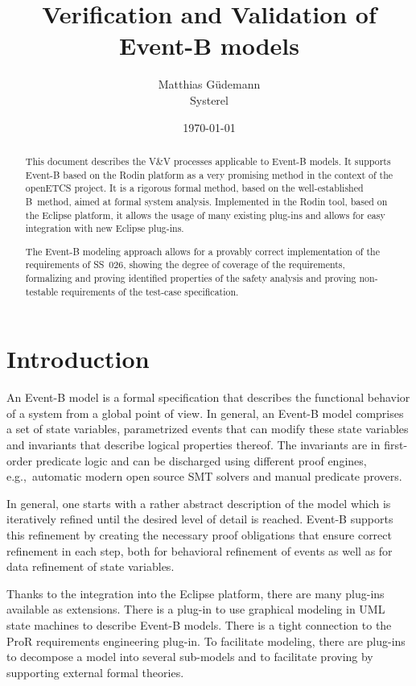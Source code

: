 \documentclass{article}
\title{Verification and Validation of Event-B models}
\author{Matthias Güdemann\\Systerel}
\date{\today}
\begin{document}
\maketitle

\begin{abstract}
  This document describes the V\&V processes applicable to Event-B models. It
  supports Event-B based on the Rodin platform as a very promising method in the
  context of the openETCS project. It is a rigorous formal method, based on the
  well-established B~method, aimed at formal system analysis. Implemented in the
  Rodin tool, based on the Eclipse platform, it allows the usage of many
  existing plug-ins and allows for easy integration with new Eclipse plug-ins.

  The Event-B modeling approach allows for a provably correct implementation of
  the requirements of SS~026, showing the degree of coverage of the
  requirements, formalizing and proving identified properties of the safety
  analysis and proving non-testable requirements of the test-case specification.
\end{abstract}

\tableofcontents

\section{Introduction}
\label{sec:introduction}

An Event-B model is a formal specification that describes the functional
behavior of a system from a global point of view. In general, an Event-B model
comprises a set of state variables, parametrized events that can modify these
state variables and invariants that describe logical properties thereof.  The
invariants are in first-order predicate logic and can be discharged using
different proof engines, e.g.,\  automatic modern open source SMT solvers and
manual predicate provers.

In general, one starts with a rather abstract description of the model which is
iteratively refined until the desired level of detail is reached. Event-B
supports this refinement by creating the necessary proof obligations that ensure
correct refinement in each step, both for behavioral refinement of events as
well as for data refinement of state variables.

Thanks to the integration into the Eclipse platform, there are many plug-ins
available as extensions. There is a plug-in to use graphical modeling in UML
state machines to describe Event-B models. There is a tight connection to the
ProR requirements engineering plug-in. To facilitate modeling, there are
plug-ins to decompose a model into several sub-models and to facilitate proving
by supporting external formal theories.
\end{document}

